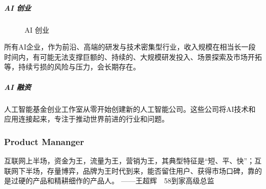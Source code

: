 \documentclass[letterpaper,10pt,english]{sphinxmanual}
\begin{document}
\subparagraph{AI 创业}
\label{\detokenize{chapter_introduction/money:ai}}
\begin{figure}[H]
\centering
\capstart

\noindent{}
\caption{AI 创业}\label{\detokenize{chapter_introduction/money:id36}}\end{figure}

所有AI企业，作为前沿、高端的研发与技术密集型行业，收入规模在相当长一段时间内，有可能无法支撑巨额的、持续的、大规模研发投入、场景探索及市场开拓等，持续亏损的风险与压力，会长期存在。%
\begin{footnote}[157]\sphinxAtStartFootnote
{}
%
\end{footnote}


\subparagraph{AI 融资}
\label{\detokenize{chapter_introduction/money:id35}}
人工智能基金创业工作室从零开始创建新的人工智能公司。这些公司将AI技术和应用连接起来，专注于推动世界前进的行业和问题。

%
\begin{footnote}[158]\sphinxAtStartFootnote
{}
%
\end{footnote}


\subsubsection{Product Mananger}
\label{\detokenize{chapter_introduction/PM:product-mananger}}\label{\detokenize{chapter_introduction/PM::doc}}
互联网上半场，资金为王，流量为王，营销为王，其典型特征是“短、平、快”；互联网下半场，存量博弈，品牌为王时代到来，能否留住用户、获得市场口碑，靠的是过硬的产品和精耕细作的产品人。
——王超辉　58到家高级总监
%
\begin{footnote}[159]\sphinxAtStartFootnote
{}
%
\end{footnote}
\end{document}
